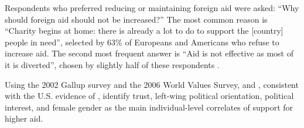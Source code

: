 Respondents who preferred reducing or maintaining foreign aid were asked: ``Why should foreign aid should not be increased?'' The most common reason is ``Charity begins at home: there is already a lot to do to support the [country] people in need'', selected by 63\% of Europeans and Americans who refuse to increase aid. The second most frequent answer is ``Aid is not effective as most of it is diverted'', chosen by slightly half of these respondents %
\citep[Figures 7, S25]{fabre_majority_2025}.%



Using the 2002 Gallup survey and the 2006 World Values Survey, \citet{bayram_aiding_2017} and \citet{paxton_individual_2012}, consistent with the U.S. evidence of \citet{heinrich_voters_2018}, identify trust, left-wing political orientation, political interest, and female gender as the main individual-level correlates of support for higher aid.


